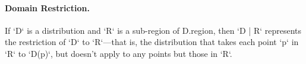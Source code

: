 {%
\paragraph{Domain Restriction.} 

If \xcd`D` is a distribution and \xcd`R` is a sub-region of {\cf
D.region}, then \xcd`D | R` represents the restriction of \xcd`D` to
\xcd`R`---that is, the distribution that takes each point \xcd`p` in \xcd`R`
to 
\xcd`D(p)`, 
but doesn't apply to any points but those in \xcd`R`.

}
